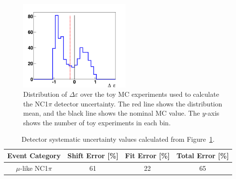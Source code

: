 \documentclass[12pt]{article}
\begin{document}
\begin{figure}[h]
  \begin{center}
    \includegraphics[width=0.5\textwidth]{ncpip_mulike_effdist}
  \end{center}
  \caption{Distribution of $\Delta \varepsilon$ over the toy MC experiments used
  to calculate the NC1$\pi$ detector uncertainty.  The red line shows the distribution
  mean, and the black line shows the nominal MC value.  The $y$-axis shows the number
  of toy experiments in each bin.}
  \label{fig:nc1pierr}
\end{figure}

\begin{table}
  \centering
  \begin{tabular}{c | c | c | c}
    \hline\hline
    Event Category & Shift Error [\%] & Fit Error [\%] & Total Error [\%] \\
    \hline
    $\mu$-like NC1$\pi$ & 61 & 22 & 65 \\
    \hline
  \end{tabular}
  \caption{Detector systematic uncertainty values calculated from Figure~\ref{fig:nc1pierr}.}
  \label{tab:nc1pierr}
\end{table}
\end{document}
